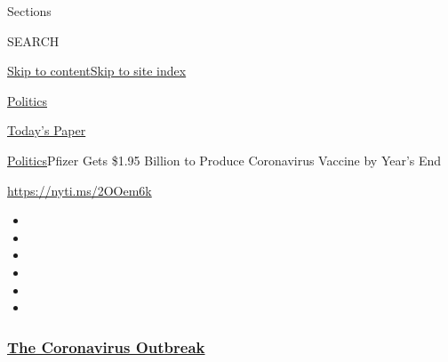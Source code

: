 Sections

SEARCH

\protect\hyperlink{site-content}{Skip to
content}\protect\hyperlink{site-index}{Skip to site index}

\href{https://www.nytimes3xbfgragh.onion/section/politics}{Politics}

\href{https://myaccount.nytimes3xbfgragh.onion/auth/login?response_type=cookie\&client_id=vi}{}

\href{https://www.nytimes3xbfgragh.onion/section/todayspaper}{Today's
Paper}

\href{/section/politics}{Politics}\textbar{}Pfizer Gets \$1.95 Billion
to Produce Coronavirus Vaccine by Year's End

\url{https://nyti.ms/2OOem6k}

\begin{itemize}
\item
\item
\item
\item
\item
\item
\end{itemize}

\hypertarget{the-coronavirus-outbreak}{%
\subsubsection{\texorpdfstring{\href{https://www.nytimes3xbfgragh.onion/news-event/coronavirus?name=styln-coronavirus-national\&region=TOP_BANNER\&variant=undefined\&block=storyline_menu_recirc\&action=click\&pgtype=Article\&impression_id=d34e7cb0-e395-11ea-81b0-ed0ce085a510}{The
Coronavirus
Outbreak}}{The Coronavirus Outbreak}}\label{the-coronavirus-outbreak}}

